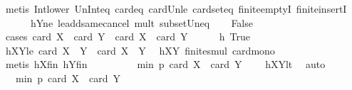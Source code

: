 \begin{isabellebody}
\ {\isacharparenleft}{\kern0pt}metis\ Int{\isacharunderscore}{\kern0pt}lower{}\ Un{\isacharunderscore}{\kern0pt}Int{\isacharunderscore}{\kern0pt}eq{\isacharparenleft}{\kern0pt}{}{\isacharparenright}{\kern0pt}\ card{\isacharunderscore}{\kern0pt}{}{\isacharunderscore}{\kern0pt}eq\ card{\isacharunderscore}{\kern0pt}Un{\isacharunderscore}{\kern0pt}le\ card{\isacharunderscore}{\kern0pt}seteq\ finite{\isachardot}{\kern0pt}emptyI\ finite{\isachardot}{\kern0pt}insertI\ \ \isanewline
\ \ \ \ \ \ hY{}ne\ le{\isacharunderscore}{\kern0pt}add{\isacharunderscore}{\kern0pt}same{\isacharunderscore}{\kern0pt}cancel{}\ mult{\isacharunderscore}{\kern0pt}{}\ subset{\isacharunderscore}{\kern0pt}Un{\isacharunderscore}{\kern0pt}eq{\isacharparenright}{\kern0pt}\isanewline
\ \ \isamarkupfalse%
\ False\isanewline
\ \ \isamarkupfalse%
\ {\isacharparenleft}{\kern0pt}cases\ {\isachardoublequoteopen}card\ {\isacharquery}{\kern0pt}X{}\ {\isacharplus}{\kern0pt}\ card\ {\isacharquery}{\kern0pt}Y{}\ {\isachargreater}{\kern0pt}\ card\ X\ {\isacharplus}{\kern0pt}\ card\ Y{\isachardoublequoteclose}{\isacharparenright}{\kern0pt}\isanewline
\ \ \ \ \isamarkupfalse%
\ h{\isacharcolon}{\kern0pt}\ True\isanewline
\ \ \ \ \isamarkupfalse%
\ hXY{}le{\isacharcolon}{\kern0pt}\ {\isachardoublequoteopen}card\ {\isacharparenleft}{\kern0pt}{\isacharquery}{\kern0pt}X{}\ {\isasymcdots}\ {\isacharquery}{\kern0pt}Y{}{\isacharparenright}{\kern0pt}\ {\isasymle}\ card\ {\isacharparenleft}{\kern0pt}X\ {\isasymcdots}\ Y{\isacharparenright}{\kern0pt}{\isachardoublequoteclose}\ \isamarkupfalse%
\ hXY{}\ finite{\isacharunderscore}{\kern0pt}smul\ card{\isacharunderscore}{\kern0pt}mono\ \isamarkupfalse%
\ {\isacharparenleft}{\kern0pt}metis\ hXfin\ hYfin{\isacharparenright}{\kern0pt}\isanewline
\ \ \ \ \isamarkupfalse%
\ \isamarkupfalse%
\ {\isachardoublequoteopen}{\isachardot}{\kern0pt}{\isachardot}{\kern0pt}{\isachardot}{\kern0pt}\ {\isacharless}{\kern0pt}\ min\ p\ {\isacharparenleft}{\kern0pt}card\ X\ {\isacharplus}{\kern0pt}\ card\ Y\ {\isacharminus}{\kern0pt}\ {}{\isacharparenright}{\kern0pt}{\isachardoublequoteclose}\ \isamarkupfalse%
\ hXYlt\ \isamarkupfalse%
\ auto\isanewline
\ \ \ \ \isamarkupfalse%
\ \isamarkupfalse%
\ {\isachardoublequoteopen}{\isachardot}{\kern0pt}{\isachardot}{\kern0pt}{\isachardot}{\kern0pt}\ {\isasymle}\ min\ p\ {\isacharparenleft}{\kern0pt}card\ {\isacharquery}{\kern0pt}X{}\ {\isacharplus}{\kern0pt}\ card\ {\isacharquery}{\kern0pt}Y{}\ {\isacharminus}{\kern0pt}\ {}{\isacharparenright}{\kern0pt}{\isachardoublequoteclose}\ \isamarkupfalse%

\end{isabellebody}
